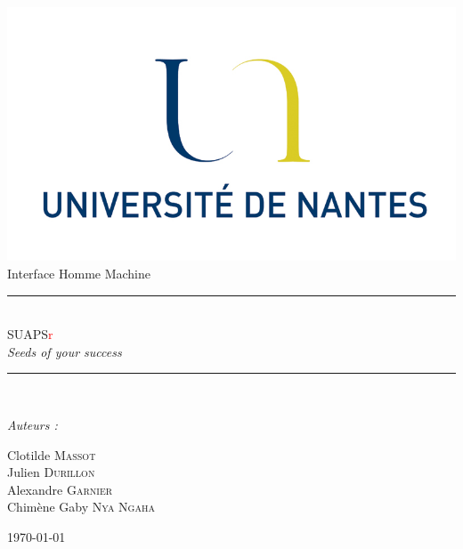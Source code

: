 \documentclass[french, titlepage, 11pt, a4paper]{article}
\newcommand{\HRule}{\rule{\linewidth}{0.5mm}} %
\begin{document}
\begin{titlepage}

\begin{center}
    \includegraphics[]{./logofac.png}\\[2cm]

    {\large Interface Homme Machine}\\[1cm]
    \HRule{}\\[0.8cm]
    {\Huge \textsf{SUAPS\textcolor{red}{r}}\textcolor{DarkOrchid}{}}\\[0.1cm]
    {\large \emph{\og Seeds of your success\fg}}\\[0.4cm]
    \HRule{}\\[3cm]



\begin{minipage}{0.4\textwidth}
\begin{flushleft} \large
\emph{Auteurs :}\\[0.2cm]
\end{flushleft}
\end{minipage}

\begin{minipage}{0.5\textwidth}
\begin{flushright} \large
Clotilde \textsc{Massot}\\
Julien \textsc{Durillon}\\
Alexandre \textsc{Garnier}\\
Chimène Gaby \textsc{Nya Ngaha}
\end{flushright}
\end{minipage}

\vfill

{\large \today}

\end{center}
\end{titlepage}
\end{document}
